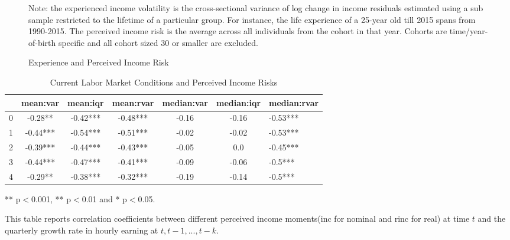 \begin{figure}[!ht]
	\caption{Experience and Perceived Income Risk}
	\label{fig:var_experience_data}
	\begin{center}
\end{center}
\begin{flushleft}Note: the experienced income volatility is the cross-sectional variance of log change in income residuals estimated using a sub sample restricted to the lifetime of a particular group. For instance, the life experience of a 25-year old till 2015 spans from 1990-2015. The perceived income risk is the average across all individuals from the cohort in that year. Cohorts are time/year-of-birth specific and all cohort sized 30 or smaller are excluded.\end{flushleft}
\end{figure}


\begin{table}[ht]
\centering
\begin{adjustbox}{width={\textwidth}}
\begin{threeparttable}
\caption{Current Labor Market Conditions and Perceived Income Risks}
\label{macro_corr_he}
\begin{tabular}{ccccccl}
\toprule
{} &  mean:var &  mean:iqr & mean:rvar & median:var & median:iqr & median:rvar \\
\midrule
0 &   -0.28** &  -0.42*** &  -0.48*** &      -0.16 &      -0.16 &    -0.53*** \\
1 &  -0.44*** &  -0.54*** &  -0.51*** &      -0.02 &      -0.02 &    -0.53*** \\
2 &  -0.39*** &  -0.44*** &  -0.43*** &      -0.05 &        0.0 &    -0.45*** \\
3 &  -0.44*** &  -0.47*** &  -0.41*** &      -0.09 &      -0.06 &     -0.5*** \\
4 &   -0.29** &  -0.38*** &  -0.32*** &      -0.19 &      -0.14 &     -0.5*** \\
\bottomrule
\end{tabular}
\begin{flushleft}
\item *** p$<$0.001, ** p$<$0.01 and * p$<$0.05.
\item This table reports correlation coefficients between different perceived income moments(inc for nominal
and rinc for real) at time
$t$ and the quarterly growth rate in hourly earning at $t,t-1,...,t-k$.
\end{flushleft}
\end{threeparttable}
\end{adjustbox}
\end{table}
\clearpage


